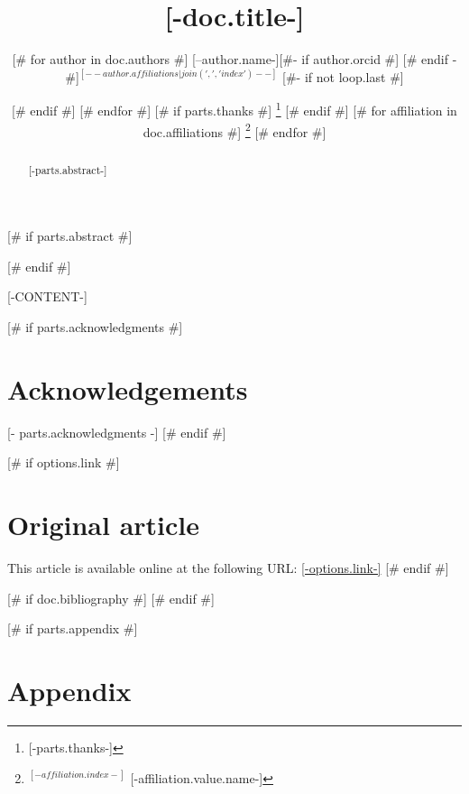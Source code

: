 \documentclass[letterpaper, 10 pt, conference]{ieeeconf}  %
\title{[-doc.title-]}
\author{
[# for author in doc.authors #]
	[--author.name-][#- if author.orcid #] \orcidlink{[- author.orcid -]} [# endif -#]$^{{[--author.affiliations|join(', ', 'index')--]}}$
	[#- if not loop.last #] \and [# endif #]
[# endfor #] %
[# if parts.thanks #]
\thanks{
[-parts.thanks-]
}
[# endif #]
[# for affiliation in doc.affiliations #]
\thanks{
$^{{[-affiliation.index-]}}$ {[-affiliation.value.name-]}
} %
[# endfor #]
}
\begin{document}
\maketitle



[# if parts.abstract #]
\begin{abstract}
[-parts.abstract-]\\
\end{abstract}
[# endif #]



[-CONTENT-]

[# if parts.acknowledgments #]
\section*{Acknowledgements}
\footnotesize
[- parts.acknowledgments -]
\normalsize
[# endif #]

[# if options.link #]
\section*{Original article}
\footnotesize
This article is available online at the following URL: \href{[-options.link-]}{[-options.link-]}
\normalsize
[# endif #]

[# if doc.bibliography #]
{\small
\printbibliography
}
[# endif #]

[# if parts.appendix #]
\clearpage
\onecolumn
\section*{Appendix}
\setcounter{secnumdepth}{0}
\clearpage
[# endif #]
\end{document}
